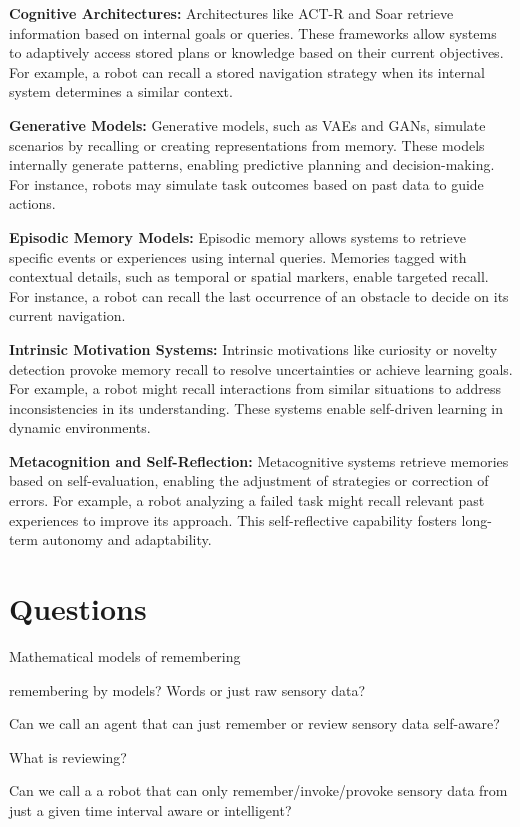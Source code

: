         \textbf{Cognitive Architectures:} Architectures like ACT-R and Soar retrieve information based on internal goals or queries. These frameworks allow systems to adaptively access stored plans or knowledge based on their current objectives. For example, a robot can recall a stored navigation strategy when its internal system determines a similar context. 

        \textbf{Generative Models:} Generative models, such as VAEs and GANs, simulate scenarios by recalling or creating representations from memory. These models internally generate patterns, enabling predictive planning and decision-making. For instance, robots may simulate task outcomes based on past data to guide actions. 

        \textbf{Episodic Memory Models:} Episodic memory allows systems to retrieve specific events or experiences using internal queries. Memories tagged with contextual details, such as temporal or spatial markers, enable targeted recall. For instance, a robot can recall the last occurrence of an obstacle to decide on its current navigation. 

        \textbf{Intrinsic Motivation Systems:} Intrinsic motivations like curiosity or novelty detection provoke memory recall to resolve uncertainties or achieve learning goals. For example, a robot might recall interactions from similar situations to address inconsistencies in its understanding. These systems enable self-driven learning in dynamic environments. 

        \textbf{Metacognition and Self-Reflection:} Metacognitive systems retrieve memories based on self-evaluation, enabling the adjustment of strategies or correction of errors. For example, a robot analyzing a failed task might recall relevant past experiences to improve its approach. This self-reflective capability fosters long-term autonomy and adaptability. 






\section{Questions}
Mathematical models of remembering

remembering by models? Words or just raw sensory data?

Can we call an agent that can just remember or review sensory data self-aware?

What is reviewing?

Can we call a a robot that can only remember/invoke/provoke sensory data from just a given time interval aware or intelligent?

